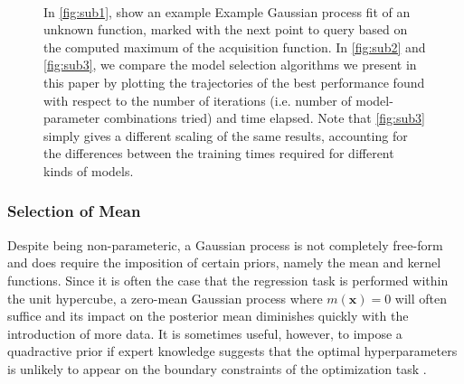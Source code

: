 \documentclass{article}
\newcommand{\x}{\mathbf{x}}
\begin{document}
\begin{figure}
  \centering
  ~
  ~

  \caption{In \ref{fig:sub1}, show an example Example Gaussian process fit of an unknown function, marked with the next point to query based on the computed maximum of the acquisition function. In \ref{fig:sub2} and \ref{fig:sub3}, we compare the model selection algorithms we present in this paper by plotting the trajectories of the best performance found with respect to the number of iterations (i.e. number of model-parameter combinations tried) and time elapsed. Note that \ref{fig:sub3} simply gives a different scaling of the same results, accounting for the differences between the training times required for different kinds of models.}
\end{figure}

\subsubsection{Selection of Mean}
Despite being non-parameteric, a Gaussian process is not completely free-form and does require the imposition of certain priors, namely the mean and kernel functions. Since it is often the case that the regression task is performed within the unit hypercube, a zero-mean Gaussian process where $m(\x) = 0$ will often suffice and its impact on the posterior mean diminishes quickly with the introduction of more data. It is sometimes useful, however, to impose a quadractive prior if expert knowledge suggests that the optimal hyperparameters is unlikely to appear on the boundary constraints of the optimization task \cite{adams:prior}. 
\end{document}
